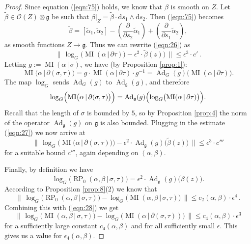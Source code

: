 \documentclass[10pt, a4paper]{amsart}
\theoremstyle{definition}
\numberwithin{equation}{section}
\newcommand{\opn}{\operatorname}
\newcommand{\mfrak}[1]{\mathfrak{#1}}
\newcommand{\mcal}[1]{\mathcal{#1}}
\newcommand{\mrm}[1]{\mathrm{#1}}
\newcommand{\smfrac}[2]{{\textstyle \frac{#1}{#2}}}
\newcommand{\til}[1]{\tilde{#1}}
\newcommand{\Norm}[1]{\bigl\lVert\, #1 \, \bigr\rVert}
\renewcommand{\vert}{\, | \,}
\newcommand{\g}{\mfrak{g}}
\renewcommand{\d}{\mrm{d}}
\begin{document}
\begin{proof}
Since equation (\ref{eqn:75}) holds, we know that $\beta$ is smooth on
$Z$. Let $\til{\beta} \in \mcal{O}(Z) \otimes \g$ be such that
$\beta|_{Z} = \til{\beta} \cdot \d s_1 \wedge \d s_2$.
Then (\ref{eqn:75}) becomes
\[ \til{\beta} = [\til{\alpha}_1, \til{\alpha}_2] - 
(\smfrac{\partial}{\partial s_2} \til{\alpha}_1) +
(\smfrac{\partial}{\partial s_1} \til{\alpha}_2) , \]
as smooth functions $Z \to \g$.
Thus we can rewrite (\ref{eqn:26}) as
\begin{equation} \label{eqn:27}
\Norm{ \log_G \bigl( \opn{MI}(\alpha \vert \partial \tau) \bigr)
- \epsilon^2 \cdot \til{\beta}(z) \bigr) } \leq \epsilon^3 \cdot c' \, .
\end{equation}
Letting
$g := \opn{MI}(\alpha \vert \sigma)$,
we have (by Proposition \ref{prop:1}):
\[ \opn{MI} \bigl( \alpha \vert \partial (\sigma, \tau) \bigr) =
g \cdot \opn{MI}(\alpha \vert \partial \tau) \cdot g^{-1} 
= \opn{Ad}_G(g) \bigl( \opn{MI}(\alpha \vert \partial \tau) \bigr) . \]
The map $\log_G$ sends $\opn{Ad}_G(g)$ to $\opn{Ad}_{\g}(g)$, and therefore
\[ \log_G \Bigl( \opn{MI} \bigl( \alpha \vert \partial (\sigma, \tau) \bigr) 
\Bigr) = \opn{Ad}_{\g}(g) \Bigl(
\log_G \bigl( \opn{MI}(\alpha \vert \partial \tau) \bigr) \Bigr) . \]
Recall that the length of $\sigma$ is bounded by $5$, so by 
Proposition \ref{prop:4} the norm of the operator 
$\opn{Ad}_{\g}(g)$ on $\g$ is also bounded. 
Plugging in the estimate (\ref{eqn:27})
we now arrive at
\begin{equation} \label{eqn:28}
\Norm{ \log_G \bigl( 
\opn{MI} \bigl( \alpha \vert \partial (\sigma, \tau) \bigr) \bigr)
- \epsilon^2 \cdot \opn{Ad}_{\g}(g) \bigl( \til{\beta}(z) \bigr) } \leq
\epsilon^3
\cdot c''' 
\end{equation}
for a suitable bound $c'''$, again depending on $(\alpha, \beta)$.

Finally, by definition we have
\[ \log_G \bigl( \opn{RP}_{0}(\alpha, \beta \vert \sigma, \tau) \bigr) = 
\epsilon^2 \cdot \opn{Ad}_{\g}(g) \bigl( \til{\beta}(z) \bigr) . \]
According to Proposition \ref{prop:8}(2) we know that
\[ \Norm{ \log_G \bigl(
\opn{RP}_{0}(\alpha, \beta \vert \sigma, \tau) \bigr)
- \log_G \bigl( \opn{MI}(\alpha, \beta \vert \sigma, \tau) \bigr) }
\leq c_2(\alpha, \beta) \cdot \epsilon^4 \, . \]
Combining this with (\ref{eqn:28}) we get
\[ \Norm{ \log_G \bigl( \opn{MI} (\alpha, \beta \vert \sigma, \tau) \bigr) -
\log_G \bigl( \opn{MI} (\alpha \vert \partial(\sigma, \tau)) \bigr) }
\leq c_4(\alpha, \beta) \cdot \epsilon^3   \]
for a sufficiently large constant $c_4(\alpha, \beta)$
and for all sufficiently small $\epsilon$. This gives us a value for
$\epsilon_4(\alpha, \beta)$.
\end{proof}
\end{document}
